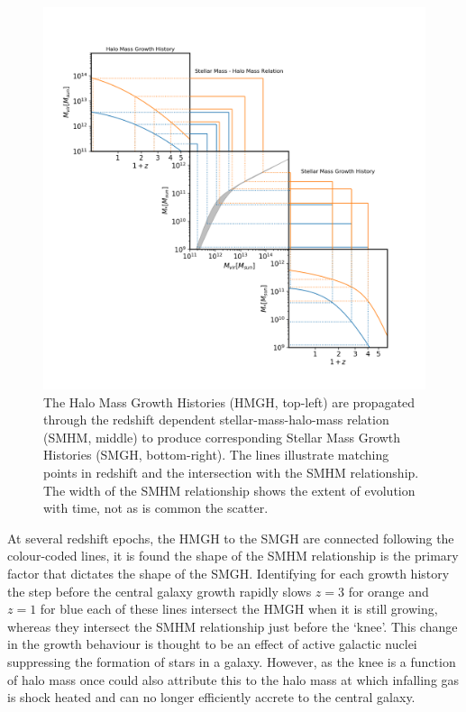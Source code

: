 \begin{figure}[h]
    \centering
    \includegraphics[width = \linewidth]{Figures/Chapter2/HMGH_to_SMGH.png}
    \caption{The Halo Mass Growth Histories (HMGH, top-left) are propagated through the redshift dependent stellar-mass-halo-mass relation (SMHM, middle) to produce corresponding Stellar Mass Growth Histories (SMGH, bottom-right). The lines illustrate matching points in redshift and the intersection with the SMHM relationship. The width of the SMHM relationship shows the extent of evolution with time, not as is common the scatter.}
    \label{fig:Cent_Mass_PP}
\end{figure}

At several redshift epochs, the HMGH to the SMGH are connected following the colour-coded lines, it is found the shape of the SMHM relationship is the primary factor that dictates the shape of the SMGH. Identifying for each growth history the step before the central galaxy growth rapidly slows $z = 3$ for orange and $z = 1$ for blue each of these lines intersect the HMGH when it is still growing, whereas they intersect the SMHM relationship just before the `knee'. This change in the growth behaviour is thought to be an effect of active galactic nuclei suppressing the formation of stars in a galaxy. However, as the knee is a function of halo mass once could also attribute this to the halo mass at which infalling gas is shock heated and can no longer efficiently accrete to the central galaxy.

